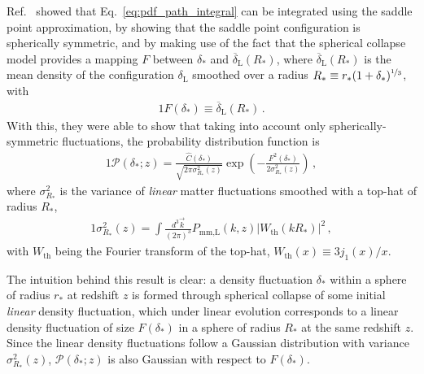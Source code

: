 \documentclass[prd,aps,10pt,nofootinbib,twocolumn,superscriptaddress,preprintnumbers,balancelastpage,longbibliography]{revtex4-1}
\begin{document}
Ref.~\cite{Ivanov:2018lcg} showed that Eq.~\eqref{eq:pdf_path_integral} can be integrated using the saddle point approximation, by showing that the saddle point configuration is spherically symmetric, and by making use of the fact that the spherical collapse model provides a mapping $F$ between $\delta_*$ and $\overline{\delta}_\text{L}(R_*)$, where $\overline{\delta}_\text{L}(R_*)$ is the mean density of the configuration $\delta_\text{L}$ smoothed over a radius $R_* \equiv r_*(1 + \delta_*)^{\nicefrac{1}{3}}$, with
%
\begin{alignat}{1}
    F(\delta_*) \equiv \overline{\delta}_\text{L}(R_*) \,.
\end{alignat}
%
With this, they were able to show that taking into account only spherically-symmetric fluctuations, the probability distribution function is
%
\begin{alignat}{1}
    \mathcal{P}(\delta_*;z) = \frac{\hat{C}(\delta_*)}{\sqrt{2\pi \sigma^2_{R_*}(z)}} \exp \left(- \frac{F^2(\delta_*)}{2 \sigma_{R_*}^2(z)}\right) \,,
    \label{eq:analytic_pdf_raw}
\end{alignat}
%
where $\sigma^2_{R_*}$ is the variance of \textit{linear} matter fluctuations smoothed with a top-hat of radius $R_*$, 
%
\begin{alignat}{1}
    \sigma^2_{R_*}(z) = \int \frac{d^3 \vec{k}}{(2\pi)^3} P_\text{mm,L}(k, z) \left| W_\text{th}(kR_*) \right|^2 \,,
\end{alignat}
%
with $W_\text{th}$ being the Fourier transform of the top-hat, $W_\text{th}(x) \equiv 3 j_1(x) / x$. 

The intuition behind this result is clear: a density fluctuation $\delta_*$ within a sphere of radius $r_*$ at redshift $z$ is formed through spherical collapse of some initial \textit{linear} density fluctuation, which under linear evolution corresponds to a linear density fluctuation of size $F(\delta_*)$ in a sphere of radius $R_*$ at the same redshift $z$. 
Since the linear density fluctuations follow a Gaussian distribution with variance $\sigma^2_{R_*}(z)$, $\mathcal{P}(\delta_*;z)$ is also Gaussian with respect to $F(\delta_*)$. 
\end{document}
